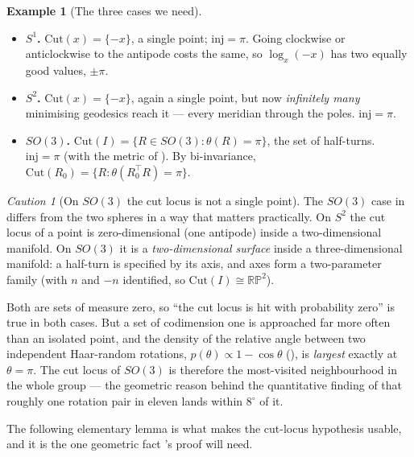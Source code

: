 \documentclass[11pt,a4paper]{report}
\theoremstyle{definition}
\newtheorem{example}[example]{Example}
\theoremstyle{remark}
\newtheorem{caution}[caution]{Caution}
\begin{document}
\begin{example}[The three cases we need]
\label{ex:cut-locus-three}
\begin{itemize}
\item \textbf{$S^1$.} $\mathrm{Cut}(x)=\{-x\}$, a single point;
      $\mathrm{inj}=\pi$. Going clockwise or anticlockwise to the antipode
      costs the same, so $\log_x(-x)$ has two equally good values, $\pm\pi$.
\item \textbf{$S^2$.} $\mathrm{Cut}(x)=\{-x\}$, again a single point, but now
      \emph{infinitely many} minimising geodesics reach it --- every meridian
      through the poles. $\mathrm{inj}=\pi$.
\item \textbf{$SO(3)$.} $\mathrm{Cut}(I)=\{R\in SO(3):\theta(R)=\pi\}$, the
      set of half-turns. $\mathrm{inj}=\pi$ (with the metric of
      ). By bi-invariance,
      $\mathrm{Cut}(R_0)=\{R:\theta(R_0^\top R)=\pi\}$.
\end{itemize}
\end{example}

\begin{caution}[On $SO(3)$ the cut locus is not a single point]
\label{caution:so3-cut-locus-size}
The $SO(3)$ case in  differs from the two spheres
in a way that matters practically. On $S^2$ the cut locus of a point is
zero-dimensional (one antipode) inside a two-dimensional manifold. On
$SO(3)$ it is a \emph{two-dimensional surface} inside a three-dimensional
manifold: a half-turn is specified by its axis, and axes form a
two-parameter family (with $n$ and $-n$ identified, so
$\mathrm{Cut}(I)\cong\mathbb{RP}^2$).

Both are sets of measure zero, so ``the cut locus is hit with probability
zero'' is true in both cases. But a set of codimension one is approached far
more often than an isolated point, and the density of the relative angle
between two independent Haar-random rotations, $p(\theta)\propto1-\cos\theta$
(), is \emph{largest} exactly at $\theta=\pi$. The
cut locus of $SO(3)$ is therefore the most-visited neighbourhood in the
whole group --- the geometric reason behind the quantitative finding of
 that roughly one rotation pair in eleven lands
within $8^\circ$ of it.
\end{caution}

The following elementary lemma is what makes the cut-locus hypothesis
usable, and it is the one geometric fact
's proof will need.
\end{document}
